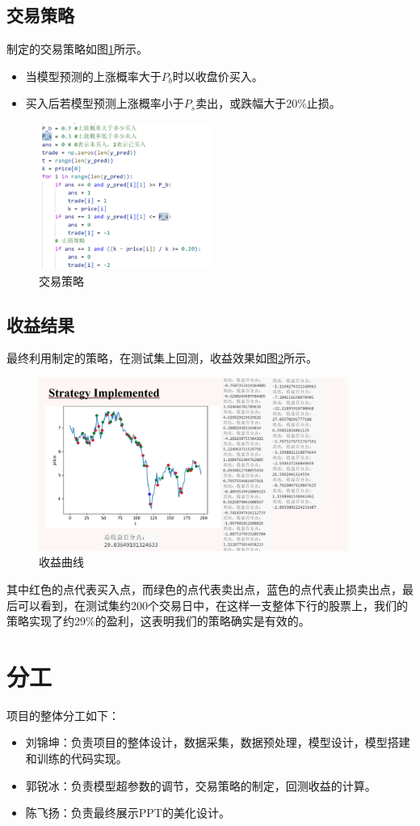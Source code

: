 \documentclass[UTF8]{ctexart}
\begin{document}
\subsection{交易策略}
制定的交易策略如图\ref{fig:strategy}所示。
\begin{itemize}
    \item 当模型预测的上涨概率大于$P_b$时以收盘价买入。
    \item 买入后若模型预测上涨概率小于$P_s$卖出，或跌幅大于20\%止损。    
\end{itemize}
\begin{figure}[htbp]
    \centering
    \includegraphics[width=0.5\textwidth]{images/strategy.png}
    \caption{交易策略}
    \label{fig:strategy}
\end{figure}
\subsection{收益结果}
最终利用制定的策略，在测试集上回测，收益效果如图\ref{fig:profit}所示。
\begin{figure}[htbp]
    \centering
    \includegraphics[width=0.9\textwidth]{images/profit.png}
    \caption{收益曲线}
    \label{fig:profit}
\end{figure}
其中红色的点代表买入点，而绿色的点代表卖出点，蓝色的点代表止损卖出点，最后可以看到，在测试集约200个交易日中，在这样一支整体下行的股票上，我们的策略实现了约29\%的盈利，这表明我们的策略确实是有效的。
\section{分工}
项目的整体分工如下：
\begin{itemize}
    \item 刘锦坤：负责项目的整体设计，数据采集，数据预处理，模型设计，模型搭建和训练的代码实现。
    \item 郭锐冰：负责模型超参数的调节，交易策略的制定，回测收益的计算。
    \item 陈飞扬：负责最终展示PPT的美化设计。
\end{itemize}
\end{document}
